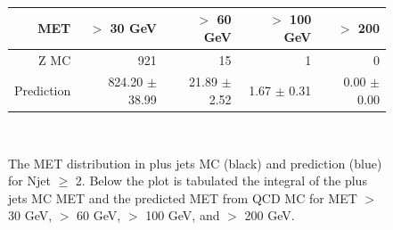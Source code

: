 \begin{figure}[hbt]
  \begin{center}
	\\ \medskip
    \begin{tabular}{r|r|r|r|r}
      MET        & $>$ 30 GeV       & $>$ 60 GeV        & $>$ 100 GeV       & $>$ 200  \\ \hline

	  Z MC       &   921               &    15               &     1               &     0 \\
	  Prediction & 824.20 $\pm$  38.99 &  21.89 $\pm$   2.52 &   1.67 $\pm$   0.31 &   0.00 $\pm$   0.00 \\


    \end{tabular}
	\\ \medskip
    \caption{The MET distribution in \Z plus jets MC (black) and prediction (blue) for Njet $\ge$ 2. 
	  Below the plot is tabulated the integral of the \Z plus jets MC MET and the predicted 
	  MET from QCD MC for 
	  MET $>$ 30 GeV, $>$ 60 GeV, $>$ 100 GeV, and $>$ 200 GeV. 
	}
    \label{fig:mcclosureqcd}
  \end{center}
\end{figure}


